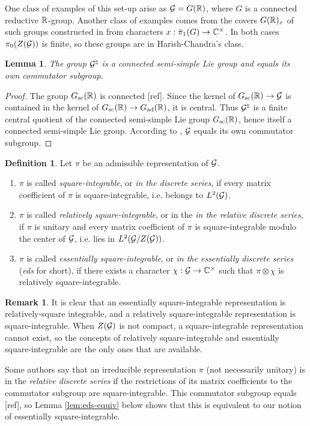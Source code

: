 \documentclass{article}
\newtheorem{lem}[thm]{Lemma}
\theoremstyle{definition}
\newtheorem{dfn}[thm]{Definition}
\newtheorem{rem}[thm]{Remark}
\numberwithin{equation}{section}
\renewcommand{\-}{\hyp{}}
\newcommand{\warn}[1]{{\leavevmode\color{red}[#1]}}
\begin{document}
One class of examples of this set-up arise as $\mathcal{G}=G(\mathbb{R})$, where $G$ is a connected reductive $\mathbb{R}$-group. Another class of examples comes from the covers $G(\mathbb{R})_x$ of such groups constructed in \cite{KalHDC} from characters $x : \bar\pi_1(G) \to \mathbb{C}^\times$. In both cases $\pi_0(Z(\mathcal{G}))$ is finite, so these groups are in  Harish-Chandra's class.

\begin{lem} \label{lem:comm}
	The group $\mathcal{G}^\natural$ is a connected semi-simple Lie group and equals its own commutator subgroup. 
\end{lem}
\begin{proof}
	The group $G_{\textrm{sc}}(\mathbb{R})$ is connected \warn{ref}. Since the kernel of $G_{\textrm{sc}}(\mathbb{R}) \to \mathcal{G}$ is contained in the kernel of $G_{\textrm{sc}}(\mathbb{R}) \to G_{\textrm{ad}}(\mathbb{R})$, it is central. Thus $\mathcal{G}^\natural$ is a finite central quotient of the connected semi-simple Lie group $G_{\textrm{sc}}(\mathbb{R})$, hence itself a connected semi-simple Lie group. According to \cite[Chapter III, \S9, no. 8, Proposition 29]{BourLie1-3}, $\mathcal{G}$ equals its own commutator subgroup.
\end{proof}

\begin{dfn}
	Let $\pi$ be an admissible representation of $\mathcal{G}$.
	\begin{enumerate}
		\item $\pi$ is called \emph{square-integrable}, or \emph{in the discrete series}, if every matrix coefficient of $\pi$ is square-integrable, i.e. belongs to $L^2(\mathcal{G})$.
  		\item $\pi$ is called \emph{relatively square-integrable}, or in the \emph{in the relative discrete series}, if $\pi$ is unitary and 
                  every matrix coefficient of $\pi$ is square-integrable modulo the center of $\mathcal{G}$, i.e. lies in $L^2(\mathcal{G}/Z(\mathcal{G}))$.

  		\item $\pi$ is called  \emph{essentially square-integrable}, or  \emph{in the essentially discrete series} (\emph{eds} for short), if there exists a character $\chi : \mathcal{G} \to \mathbb{C}^\times$ such that $\pi \otimes \chi$ is relatively square-integrable.
	\end{enumerate}
\end{dfn}

\begin{rem}
It is clear that an essentially square-integrable representation is relatively-square integrable, and a relatively square-integrable representation is square-integrable. When $Z(\mathcal{G})$ is not compact, a square-integrable representation cannot exist, so the concepts of relatively square-integrable and essentially square-integrable are the only ones that are available.

Some authors say that an irreducible representation $\pi$ (not necessarily unitary) is in the \emph{relative discrete series} if the restrictions of its matrix coefficients to the commutator subgroup are square-integrable. This commutator subgroup equals \warn{ref}, so Lemma \ref{lem:eds-equiv} below shows that this is equivalent to our notion of essentially square-integrable.
\end{rem}
\end{document}

